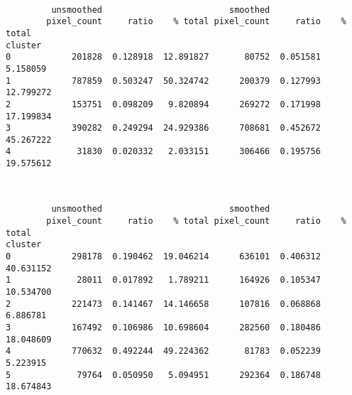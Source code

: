 \documentclass[11pt]{article}
\begin{document}
    
    \begin{center}
    \end{center}
    { \hspace*{\fill} \\}
    
    
    \begin{verbatim}
         unsmoothed                         smoothed                     
        pixel_count     ratio    % total pixel_count     ratio    % total
cluster                                                                  
0            201828  0.128918  12.891827       80752  0.051581   5.158059
1            787859  0.503247  50.324742      200379  0.127993  12.799272
2            153751  0.098209   9.820894      269272  0.171998  17.199834
3            390282  0.249294  24.929386      708681  0.452672  45.267222
4             31830  0.020332   2.033151      306466  0.195756  19.575612
    \end{verbatim}

    
    \begin{center}
    \end{center}
    { \hspace*{\fill} \\}
    
    
    \begin{verbatim}
         unsmoothed                         smoothed                     
        pixel_count     ratio    % total pixel_count     ratio    % total
cluster                                                                  
0            298178  0.190462  19.046214      636101  0.406312  40.631152
1             28011  0.017892   1.789211      164926  0.105347  10.534700
2            221473  0.141467  14.146658      107816  0.068868   6.886781
3            167492  0.106986  10.698604      282560  0.180486  18.048609
4            770632  0.492244  49.224362       81783  0.052239   5.223915
5             79764  0.050950   5.094951      292364  0.186748  18.674843
    \end{verbatim}

    
    \begin{center}
    \end{center}
    { \hspace*{\fill} \\}
    
\end{document}
